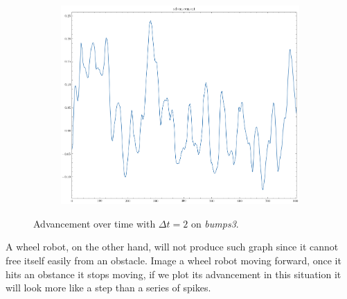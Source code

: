 \documentclass[../document.tex]{subfiles}
\begin{document}
    \begin{figure}[htbp]
        \centering
        \begin{subfigure}[b]{0.45\textwidth}
            \includegraphics[width=\linewidth]{../img/3/find_tr/100-bumps3}
        \end{subfigure}
    
    \caption{Advancement over time with  $\Delta t = 2$ on \emph{bumps3}.}
    \label{fig : krock-bumps-advs}
    \end{figure}
    A wheel robot, on the other hand, will not produce such graph since it cannot free itself easily from an obstacle. Image a wheel robot moving forward, once it hits an obstance it stops moving, if we plot its advancement in this situation it will look more like a step than a series of spikes.
\end{document}
